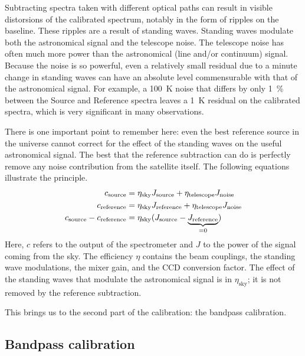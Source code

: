 Subtracting spectra taken with different optical paths can result in visible distorsions of the calibrated spectrum, notably in the form of ripples on the baseline.
These ripples are a result of standing waves.
Standing waves modulate both the astronomical signal and the telescope noise.
The telescope noise has often much more power than the astronomical (line and/or continuum) signal.
Because the noise is so powerful, even a relatively small residual due to a minute change in standing waves can have an absolute level commensurable with that of the astronomical signal.
For example, a \SI{100}{\kelvin} noise that differs by only \SI{1}{\percent} between the Source and Reference spectra leaves a \SI{1}{\kelvin} residual on the calibrated spectra, which is very significant in many observations.

There is one important point to remember here: even the best reference source in the universe cannot correct for the effect of the standing waves on the useful astronomical signal.
The best that the reference subtraction can do is perfectly remove any noise contribution from the satellite itself.
The following equations illustrate the principle.
\begin{align}
    c_\text{source}    &= \eta_\text{sky} J_\text{source} + \eta_\text{telescope} J_\text{noise} \notag
    \\
    c_\text{reference} &= \eta_\text{sky} J_\text{reference} + \eta_\text{telescope} J_\text{noise} \notag
    \\
    c_\text{source} - c_\text{reference} &= \eta_\text{sky} (J_\text{source} - \underbrace{J_\text{reference}}_{=0}) \label{eq:remove_noise_only}
\end{align}
Here, $c$ refers to the output of the spectrometer and $J$ to the power of the signal coming from the sky.
The efficiency $\eta$ contains the beam couplings, the standing wave modulations, the mixer gain, and the CCD conversion factor.
The effect of the standing waves that modulate the astronomical signal is in $\eta_\text{sky}$; it is not removed by the reference subtraction.

This brings us to the second part of the calibration: the bandpass calibration.

\subsection{Bandpass calibration}


